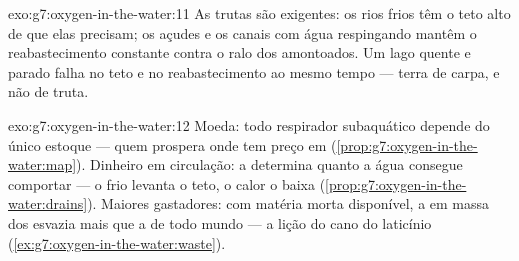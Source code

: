 \begin{solution}{exo:g7:oxygen-in-the-water:11}
As trutas são  exigentes: os rios frios têm o teto alto de que
elas precisam; os açudes e os canais com água respingando mantêm o
reabastecimento constante contra o ralo dos  amontoados. Um lago
quente e parado falha no teto e no reabastecimento ao mesmo tempo ---
terra de carpa, e não de truta.
\end{solution}

\begin{solution}{exo:g7:oxygen-in-the-water:12}
Moeda: todo respirador subaquático depende do único estoque 
--- quem prospera onde tem preço em 
(\cref{prop:g7:oxygen-in-the-water:map}). Dinheiro em circulação: a
 determina quanto a água consegue comportar --- o frio
levanta o teto, o calor o baixa
(\cref{prop:g7:oxygen-in-the-water:drains}). Maiores gastadores: com
matéria morta disponível, a  em massa dos 
esvazia mais que a de todo mundo --- a lição do cano do laticínio
(\cref{ex:g7:oxygen-in-the-water:waste}).
\end{solution}

